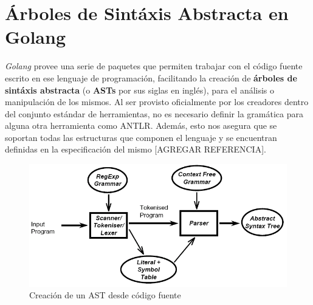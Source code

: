 \section{Árboles de Sintáxis Abstracta en Golang}

\textit{Golang} provee una serie de paquetes que permiten trabajar con el código fuente escrito en ese 
lenguaje de programación, facilitando la creación de \textbf{árboles de sintáxis abstracta}
(o \textbf{ASTs} por sus siglas en inglés), para el análisis o manipulación de los mismos.
Al ser provisto oficialmente por los creadores dentro del conjunto estándar de herramientas, 
no es necesario definir la gramática para alguna otra herramienta como ANTLR.
Además, esto nos asegura que se soportan todas las estructuras que componen el lenguaje 
y se encuentran definidas en la especificación del mismo [AGREGAR REFERENCIA].

\begin{figure}[H]
  \includegraphics[width=12cm]{implementation/parsingpipeline}
  \centering
  \caption{Creación de un AST desde código fuente}
\end{figure}

